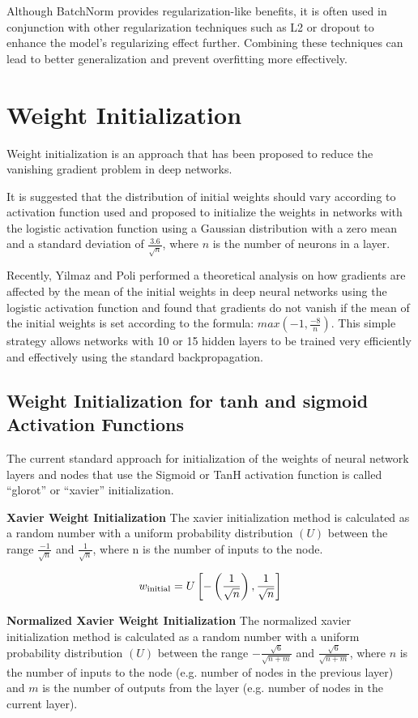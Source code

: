 \documentclass{report}
\begin{document}
Although BatchNorm provides regularization-like benefits, it is often used in conjunction with other regularization techniques such as L2 or dropout to enhance the model's regularizing effect further. Combining these techniques can lead to better generalization and prevent overfitting more effectively.

\section{Weight Initialization}
Weight initialization is an approach that has been proposed to reduce the vanishing gradient problem in deep networks.

It is suggested that the distribution of initial weights should vary according to activation function used and proposed to initialize the weights in networks with the logistic activation function using a Gaussian distribution with a zero mean and a standard deviation of $\frac{3.6}{\sqrt{n}}$, where $n$ is the number of neurons in a layer.

Recently, Yilmaz and Poli performed a theoretical analysis on how gradients are affected by the mean of the initial weights in deep neural networks using the logistic activation function and found that gradients do not vanish if the mean of the initial weights is set according to the formula: $max(-1,\frac{-8}{n})$. This simple strategy allows networks with 10 or 15 hidden layers to be trained very efficiently and effectively using the standard backpropagation.

\subsection{Weight Initialization for tanh and sigmoid Activation Functions}
The current standard approach for initialization of the weights of neural network layers and nodes that use the Sigmoid or TanH activation function is called “glorot” or “xavier” initialization.

\textbf{Xavier Weight Initialization}
The xavier initialization method is calculated as a random number with a uniform probability distribution $(U)$ between the range $\frac{-1}{\sqrt{n}}$ and $\frac{1}{\sqrt{n}}$, where n is the number of inputs to the node.

$$w_\text{initial} = U\left[-\left(\frac{1}{\sqrt{n}}\right), \frac{1}{\sqrt{n}}\right]$$

\textbf{Normalized Xavier Weight Initialization}
The normalized xavier initialization method is calculated as a random number with a uniform probability distribution $(U)$ between the range $-\frac{\sqrt{6}}{\sqrt{n + m}}$ and $\frac{\sqrt{6}}{\sqrt{n+m}}$, where $n$ is the number of inputs to the node (e.g. number of nodes in the previous layer) and $m$ is the number of outputs from the layer (e.g. number of nodes in the current layer).
\end{document}
